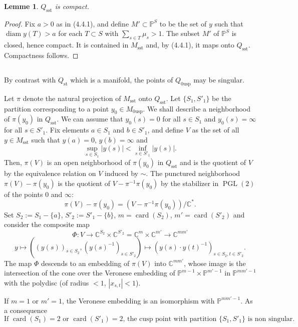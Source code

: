 \documentclass[12pt,a4paper]{article}
\theoremstyle{plain}
\newtheorem{lemma}[theorem]{Lemme}
\theoremstyle{definition}
\theoremstyle{remark}
\DeclareMathOperator{\card}{card}
\DeclareMathOperator{\diam}{diam}
\DeclareMathOperator{\PGL}{PGL}
\newcommand{\CC}{\mathbb{C}}
\newcommand{\PP}{\mathbb{P}}
\numberwithin{equation}{section}
\providecommand{\CC}{\mathbb{C}}
\providecommand{\PP}{\mathbb{P}}
\providecommand{\PGL}{\operatorname{PGL}}
\begin{document}
\begin{lemma}\label{lem:4.4.2}
$Q_{\mathrm{sst}}$ is compact.
\end{lemma}

\begin{proof}
Fix $a > 0$ as in (4.4.1), and define $M' \subset \PP^S$ to be the set of $y$ such that $\diam y(T) > a$ for each $T \subset S$ with $\sum_{s \in T} \mu_s > 1$. The subset $M'$ of $\PP^S$ is closed, hence compact. It is contained in $M_{\mathrm{sst}}$ and, by (4.4.1), it maps onto $Q_{\mathrm{sst}}$. Compactness follows.
\end{proof}

\subsection{}
By contrast with $Q_{\mathrm{st}}$ which is a manifold, the points of $Q_{0\mathrm{usp}}$ may be singular.

Let $\pi$ denote the natural projection of $M_{\mathrm{sst}}$ onto $Q_{\mathrm{sst}}$. Let $\{S_1, S'_1\}$ be the partition corresponding to a point $y_0 \in M_{0\mathrm{usp}}$. We shall describe a neighborhood of $\pi(y_0)$ in $Q_{\mathrm{sst}}$. We can assume that $y_0(s) = 0$ for all $s \in S_1$ and $y_0(s) = \infty$ for all $s \in S'_1$. Fix elements $a \in S_1$ and $b \in S'_1$, and define $V$ as the set of all $y \in M_{\mathrm{sst}}$ such that $y(a) = 0$, $y(b) = \infty$ and
\[
\sup_{s \in S_1} |y(s)| < \inf_{s \in S'_1} |y(s)|.
\]
Then, $\pi(V)$ is an open neighborhood of $\pi(y_0)$ in $Q_{\mathrm{sst}}$ and is the quotient of $V$ by the equivalence relation on $V$ induced by $\sim$. The punctured neighborhood $\pi(V) - \pi(y_0)$ is the quotient of $V - \pi^{-1}\pi(y_0)$ by the stabilizer in $\PGL(2)$ of the points $0$ and $\infty$:
\[
\pi(V) - \pi(y_0) = (V - \pi^{-1}\pi(y_0))/\CC^*.
\]
Set $S_2 := S_1 - \{a\}$, $S'_2 := S'_1 - \{b\}$, $m = \card(S_2)$, $m' = \card(S'_2)$ and consider the composite map
\[
\Phi: V \to \CC^{S_2} \times \CC^{S'_2} = \CC^m \times \CC^{m'} \to \CC^{mm'}
\]
\[
y \mapsto ((y(s))_{s \in S_2}, (y(s)^{-1})_{s \in S'_2}) \mapsto (y(s) \cdot y(t)^{-1})_{s \in S_2, t \in S'_2}.
\]
The map $\Phi$ descends to an embedding of $\pi(V)$ into $\CC^{mm'}$, whose image is the intersection of the cone over the Veronese embedding of $\PP^{m-1} \times \PP^{m'-1}$ in $\PP^{mm'-1}$ with the polydisc (of radius $< 1$, $|x_{s,t}| < 1$).

If $m = 1$ or $m' = 1$, the Veronese embedding is an isomorphism with $\PP^{mm'-1}$. As a consequence
\begin{equation}\label{eq:4.5.1}
\text{If $\card(S_1) = 2$ or $\card(S'_1) = 2$, the cusp point with partition $\{S_1, S'_1\}$ is non singular.}
\end{equation}
\end{document}

